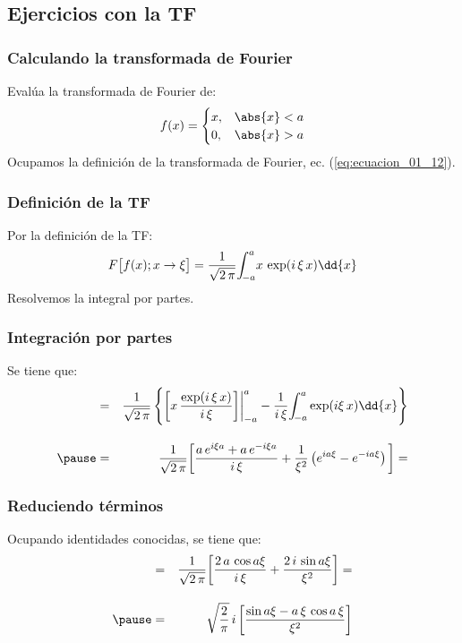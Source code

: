 \subsection{Ejercicios con la TF}

\begin{frame}
\frametitle{Calculando la transformada de Fourier}
Evalúa la transformada de Fourier de:
\begin{align*}
f(x) = \begin{cases}
x, & \abs{x} < a \\
0, & \abs{x} > a
\end{cases}
\end{align*}
\pause
Ocupamos la definición de la transformada de Fourier, ec. (\ref{eq:ecuacion_01_12}).
\end{frame}
\begin{frame}
\frametitle{Definición de la TF}
Por la definición de la TF:
\begin{align*}
F \big[ f(x); x \to \xi \big] = \dfrac{1}{\sqrt{2 \, \pi}} \scaleint{5ex}_{\bs -a}^{a} x \, \exp(i \, \xi \, x) \dd{x}
\end{align*}
\pause
Resolvemos la integral por partes.
\end{frame}
\begin{frame}
\frametitle{Integración por partes}
Se tiene que:
\pause
\begin{eqnarray*}
&=& \dfrac{1}{\sqrt{2 \, \pi}} \left\{ \bigg[ x \, \dfrac{\exp(i \, \xi \, x)}{i \, \xi} \bigg] \bigg\vert_{-a}^{a} - \dfrac{1}{i \, \xi} \scaleint{5ex}_{\bs -a}^{a} \exp(i \xi \, x) \dd{x} \right\} \\[1em] \pause
&=& \dfrac{1}{\sqrt{2 \, \pi}} \bigg[ \dfrac{a \, e^{i \xi a} + a \, e^{-i \xi a}}{i \, \xi} + \dfrac{1}{\xi^{2}} \left( e^{i a \xi} - e^{-i a \xi} \right) \bigg] =
\end{eqnarray*}
\end{frame}
\begin{frame}
\frametitle{Reduciendo términos}
Ocupando identidades conocidas, se tiene que:
\pause
\begin{eqnarray*}
&=& \dfrac{1}{\sqrt{2 \, \pi}} \bigg[ \dfrac{2 \, a \, \cos a \xi}{i \, \xi} + \dfrac{2 \, i \, \sin a \xi}{\xi^{2}} \bigg] = \\[1em] \pause
&=& \sqrt{\dfrac{2}{\pi}} \, i \, \bigg[ \dfrac{\sin a \xi - a \, \xi \, \cos a \, \xi}{\xi^{2}} \bigg]
\end{eqnarray*}
\end{frame}

